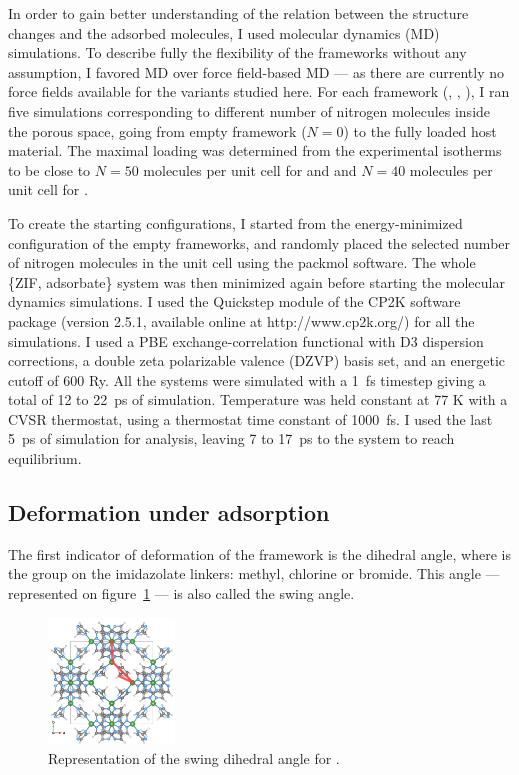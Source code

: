 \documentclass[thesis]{subfiles}
\begin{document}
In order to gain better understanding of the relation between the structure
changes and the adsorbed molecules, I used molecular dynamics (MD) simulations.
To describe fully the flexibility of the frameworks without any assumption, I
favored \abinitio MD over force field-based MD --- as there are currently no
force fields available for the  variants studied here. For each framework
(, \ZIFCl, \ZIFBr), I ran five simulations corresponding to different
number of nitrogen molecules inside the porous space, going from empty framework
($N = 0$) to the fully loaded host material. The maximal loading was determined
from the experimental isotherms to be close to $N = 50$ molecules per unit cell
for  and \ZIFCl and $N = 40$ molecules per unit cell for \ZIFBr.

To create the starting configurations, I started from the energy-minimized
configuration of the empty frameworks, and randomly placed the selected number
of nitrogen molecules in the unit cell using the packmol
software\cite{Martnez2009}.  The whole \{ZIF, adsorbate\} system was then
minimized again before starting the molecular dynamics simulations. I used the
Quickstep module\cite{VandeVondele2005} of the CP2K software package (version
2.5.1, available online at http://www.cp2k.org/) for all the simulations. I used
a PBE exchange-correlation functional with D3 dispersion corrections, a double
zeta polarizable valence (DZVP) basis set, and an energetic cutoff of 600 Ry.
All the systems were simulated with a \SI{1}{fs} timestep giving a total of 12
to \SI{22}{ps} of simulation. Temperature was held constant at 77 K with a CVSR
thermostat, using a thermostat time constant of \SI{1000}{fs}. I used the last
\SI{5}{ps} of simulation for analysis, leaving 7 to \SI{17}{ps} to the system to
reach equilibrium.

\subsection{Deformation under adsorption}

The first indicator of deformation of the framework is the 
dihedral angle, where  is the group on the imidazolate linkers: methyl,
chlorine or bromide. This angle --- represented on
figure~\ref{fig:zif8x:swing-angle} --- is also called the swing angle.

\begin{figure}[ht]
    \centering
    \includegraphics[width=0.3\textwidth]{figures/images/swing-angle}
    \caption{Representation of the swing  dihedral angle for .}
    \label{fig:zif8x:swing-angle}
\end{figure}
\end{document}
